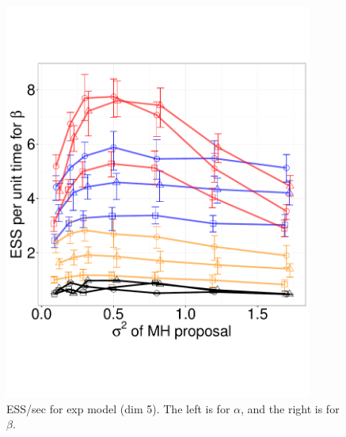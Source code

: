 \begin{figure}
\begin{minipage}[hp]{0.45\linewidth}
    \includegraphics [width=0.90\textwidth, angle=0]{figs/exp_5_beta.pdf}
    \vspace{-0 in}
  \end{minipage}
    \caption{ESS/sec for exp model (dim 5). The left is for $\alpha$, and the right is for $\beta$.}
     \label{fig:ESS_EXP_D5}
  \end{figure}

